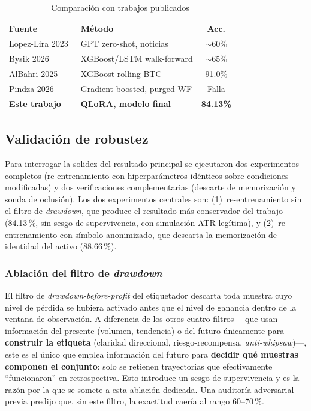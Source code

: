 \documentclass[10pt,twocolumn]{article}
\begin{document}
\begin{table}[H]
\centering
\caption{Comparaci\'on con trabajos publicados}
\label{tab:literature}
\footnotesize
\begin{tabularx}{\columnwidth}{lXc}
\toprule
\textbf{Fuente} & \textbf{M\'etodo} & \textbf{Acc.} \\
\midrule
Lopez-Lira 2023~\cite{lopez2023} & GPT zero-shot, noticias & $\sim$60\% \\
Bysik 2026~\cite{bysik2026} & XGBoost/LSTM walk-forward & $\sim$65\% \\
AlBahri 2025 & XGBoost rolling BTC & 91.0\% \\
Pindza 2026~\cite{pindza2026} & Gradient-boosted, purged WF & Falla \\
\textbf{Este trabajo} & \textbf{QLoRA, modelo final} & \textbf{84.13\%} \\
\bottomrule
\end{tabularx}
\end{table}

\subsection{Validaci\'on de robustez}
\label{sec:robustness}

Para interrogar la solidez del resultado principal se ejecutaron dos experimentos completos (re-entrenamiento con hiperpar\'ametros id\'enticos sobre condiciones modificadas) y dos verificaciones complementarias (descarte de memorizaci\'on y sonda de oclusi\'on). Los dos experimentos centrales son: (1)~re-entrenamiento sin el filtro de \textit{drawdown}, que produce el resultado m\'as conservador del trabajo (84.13\,\%, sin sesgo de supervivencia, con simulaci\'on ATR leg\'itima), y (2)~re-entrenamiento con s\'imbolo anonimizado, que descarta la memorizaci\'on de identidad del activo (88.66\,\%).

\subsubsection{Ablaci\'on del filtro de \textit{drawdown}}
\label{sec:ablation-drawdown}

El filtro de \textit{drawdown-before-profit} del etiquetador descarta toda muestra cuyo nivel de p\'erdida se hubiera activado antes que el nivel de ganancia dentro de la ventana de observaci\'on. A diferencia de los otros cuatro filtros ---que usan informaci\'on del presente (volumen, tendencia) o del futuro \'unicamente para \textbf{construir la etiqueta} (claridad direccional, riesgo-recompensa, \textit{anti-whipsaw})---, este es el \'unico que emplea informaci\'on del futuro para \textbf{decidir qu\'e muestras componen el conjunto}: solo se retienen trayectorias que efectivamente ``funcionaron'' en retrospectiva. Esto introduce un sesgo de supervivencia y es la raz\'on por la que se somete a esta ablaci\'on dedicada. Una auditor\'ia adversarial previa predijo que, sin este filtro, la exactitud caer\'ia al rango 60--70\,\%.
\end{document}
